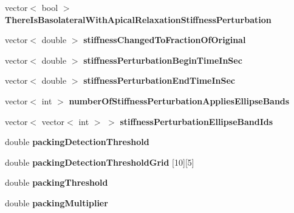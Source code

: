 \begin{DoxyCompactItemize}
\item 
\hypertarget{classSimulation_a98df3862b497000d00fe5d137ec9878e}{}vector$<$ bool $>$ {\bfseries There\+Is\+Basolateral\+With\+Apical\+Relaxation\+Stiffness\+Perturbation}\label{classSimulation_a98df3862b497000d00fe5d137ec9878e}

\item 
\hypertarget{classSimulation_a564a571fe5771c7b3faad2efadf579bd}{}vector$<$ double $>$ {\bfseries stiffness\+Changed\+To\+Fraction\+Of\+Original}\label{classSimulation_a564a571fe5771c7b3faad2efadf579bd}

\item 
\hypertarget{classSimulation_ae1ddabda118d04517597486b32913468}{}vector$<$ double $>$ {\bfseries stiffness\+Perturbation\+Begin\+Time\+In\+Sec}\label{classSimulation_ae1ddabda118d04517597486b32913468}

\item 
\hypertarget{classSimulation_a5a8ee53e9f9f86fe2035296a3bf4e1d0}{}vector$<$ double $>$ {\bfseries stiffness\+Perturbation\+End\+Time\+In\+Sec}\label{classSimulation_a5a8ee53e9f9f86fe2035296a3bf4e1d0}

\item 
\hypertarget{classSimulation_ae991a785d3a199c2e91f6e7f7ba2930b}{}vector$<$ int $>$ {\bfseries number\+Of\+Stiffness\+Perturbation\+Applies\+Ellipse\+Bands}\label{classSimulation_ae991a785d3a199c2e91f6e7f7ba2930b}

\item 
\hypertarget{classSimulation_ad39f96c99871095d3272c1bc0745a144}{}vector$<$ vector$<$ int $>$ $>$ {\bfseries stiffness\+Perturbation\+Ellipse\+Band\+Ids}\label{classSimulation_ad39f96c99871095d3272c1bc0745a144}

\item 
\hypertarget{classSimulation_ab83a9bfa83ac45f58129afb916a129ce}{}double {\bfseries packing\+Detection\+Threshold}\label{classSimulation_ab83a9bfa83ac45f58129afb916a129ce}

\item 
\hypertarget{classSimulation_a0c55eae62bd214951ca78098e2daf7a4}{}double {\bfseries packing\+Detection\+Threshold\+Grid} \mbox{[}10\mbox{]}\mbox{[}5\mbox{]}\label{classSimulation_a0c55eae62bd214951ca78098e2daf7a4}

\item 
\hypertarget{classSimulation_afa0e72518548c938a0c4974e432f9d83}{}double {\bfseries packing\+Threshold}\label{classSimulation_afa0e72518548c938a0c4974e432f9d83}

\item 
\hypertarget{classSimulation_a7a39e3f43e8c3af42da95a827a0a7d5d}{}double {\bfseries packing\+Multiplier}\label{classSimulation_a7a39e3f43e8c3af42da95a827a0a7d5d}


\end{DoxyCompactItemize}
